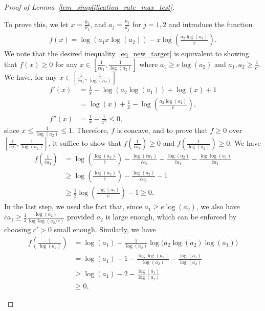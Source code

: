 \documentclass{article}
\begin{document}
\begin{proof}[Proof of Lemma~\ref{lem_simplification_rate_max_test}]
\begin{enumerate}
    To prove this, we let $x = \frac{k_2}{k_1}$, and $a_j = \frac{n_j}{k_j}$ for $j=1,2$ and introduce the function 
\begin{align*}
    f(x) = \log\left(a_1 x \log(a_2)\right) - x \log\left(\frac{a_2\log(a_1)}{x}\right).
\end{align*}
We note that the desired inequality~\eqref{eq_new_target} is equivalent to showing that $f(x) \geq 0$ for any $x \in \left[\frac{1}{\bar c a_1}, \frac{1}{\log(a_2)}\right]$ where $a_1 \geq e \log(a_2)$ and $a_1, a_2 \geq \frac{1}{c'}$.
We have, for any $x \in \left[\frac{1}{\bar c a_1}, \frac{1}{\log(a_2)}\right]$
\begin{align*}
    f'(x) &= \frac{1}{x} - \log(a_2 \log(a_1)) + \log(x) + 1 \\
    & = \log(x) + \frac{1}{x} - \log\left(\frac{a_2 \log(a_1)}{e}\right),\\
    f''(x) &= \frac{1}{x} - \frac{1}{x^2} \leq 0,
\end{align*}
since $x \leq \frac{1}{\log(a_2)} \leq 1$. 
Therefore, $f$ is concave, and to prove that $f \geq 0$ over $\left[\frac{1}{\bar c a_1}, \frac{1}{\log(a_2)}\right]$, it suffice to show that $f\left(\frac{1}{\bar c a_1}\right) \geq 0$ and $f \left(\frac{1}{\log(a_2)}\right)\geq 0$. 
We have
\begin{align*}
    f\left(\frac{1}{\bar c a_1}\right) &= \log\left(\frac{\log(a_2)}{\bar c}\right) - \frac{\log(\bar c a_1)}{\bar c a_1}  - \frac{\log(a_2)}{\bar c a_1} - \frac{\log\log(a_1)}{\bar c a_1}\\
    &\geq \log\left(\frac{\log(a_2)}{\bar c}\right)   - \frac{\log(a_2)}{\bar c a_1} - 1\\
    & \geq \frac{1}{2}\log\left(\frac{\log(a_2)}{\bar c}\right) - 1 \geq 0.
\end{align*}
In the last step, we used the fact that, since $a_1 \geq e \log(a_2)$, we also have $\bar c a_1 \geq \frac{1}{2} \frac{\log(a_2)}{\log \log(a_2/\bar c)}$
provided $a_2$ is large enough, which can be enforced by choosing $c'>0$ small enough. 
Similarly, we have
\begin{align*}
    f\left(\frac{1}{\log(a_2)}\right) &= \log(a_1) - \frac{1}{\log(a_2)} \log\Big(a_2\log(a_2)\log(a_1)\Big)\\
    & = \log(a_1) - 1 - \frac{\log \log(a_2)}{\log(a_2)} - \frac{\log(a_1)}{\log(a_2)}\\
    & \geq \log(a_1) - 2 - \frac{\log(a_1)}{\log(a_2)}\\
    &
    \geq 0,
\end{align*}

\end{enumerate}
\end{proof}
\end{document}
